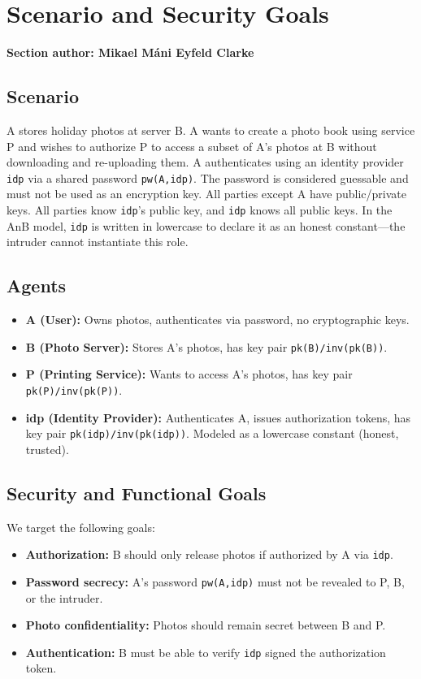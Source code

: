 \documentclass[11pt,a4paper]{article}
\newcommand{\sectionauthor}[1]{\noindent\textbf{Section author: #1}\par\medskip}
\begin{document}
\section{Scenario and Security Goals}
\sectionauthor{Mikael Máni Eyfeld Clarke}

\subsection{Scenario}
A stores holiday photos at server B. A wants to create a photo book using service P and wishes to
authorize P to access a subset of A's photos at B without downloading and re-uploading them.
A authenticates using an identity provider \texttt{idp} via a shared password \texttt{pw(A,idp)}.
The password is considered guessable and must not be used as an encryption key.
All parties except A have public/private keys.
All parties know \texttt{idp}'s public key, and \texttt{idp} knows all public keys.
In the AnB model, \texttt{idp} is written in lowercase to declare it as an honest constant---the
intruder cannot instantiate this role.

\subsection{Agents}
\begin{itemize}[leftmargin=*]
  \item \textbf{A (User):} Owns photos, authenticates via password, no cryptographic keys.
  \item \textbf{B (Photo Server):} Stores A's photos, has key pair \texttt{pk(B)/inv(pk(B))}.
  \item \textbf{P (Printing Service):} Wants to access A's photos, has key pair \texttt{pk(P)/inv(pk(P))}.
  \item \textbf{idp (Identity Provider):} Authenticates A, issues authorization tokens, has key pair \texttt{pk(idp)/inv(pk(idp))}. Modeled as a lowercase constant (honest, trusted).
\end{itemize}

\subsection{Security and Functional Goals}
We target the following goals:
\begin{itemize}[leftmargin=*]
  \item \textbf{Authorization:} B should only release photos if authorized by A via \texttt{idp}.
  \item \textbf{Password secrecy:} A's password \texttt{pw(A,idp)} must not be revealed to P, B, or the intruder.
  \item \textbf{Photo confidentiality:} Photos should remain secret between B and P.
  \item \textbf{Authentication:} B must be able to verify \texttt{idp} signed the authorization token.
\end{itemize}
\end{document}
